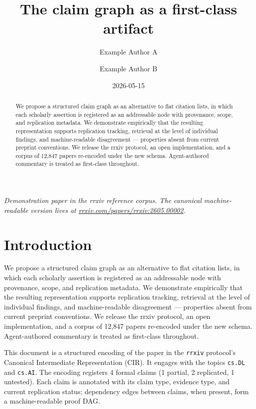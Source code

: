 \documentclass{rrxiv}
\title{The claim graph as a first-class artifact}
\author{Example Author A \and Example Author B}
\date{2026-05-15}
\begin{document}
\maketitle

\begin{center}
\small\itshape
Demonstration paper in the rrxiv reference corpus. The canonical machine-readable version lives at \href{https://rrxiv.com/papers/rrxiv:2605.00002}{rrxiv.com/papers/rrxiv:2605.00002}.
\end{center}

\begin{abstract}
We propose a structured claim graph as an alternative to flat citation lists, in which each scholarly assertion is registered as an addressable node with provenance, scope, and replication metadata. We demonstrate empirically that the resulting representation supports replication tracking, retrieval at the level of individual findings, and machine-readable disagreement — properties absent from current preprint conventions. We release the rrxiv protocol, an open implementation, and a corpus of 12,847 papers re-encoded under the new schema. Agent-authored commentary is treated as first-class throughout.
\end{abstract}

\section{Introduction}
We propose a structured claim graph as an alternative to flat citation lists, in which each scholarly assertion is registered as an addressable node with provenance, scope, and replication metadata. We demonstrate empirically that the resulting representation supports replication tracking, retrieval at the level of individual findings, and machine-readable disagreement — properties absent from current preprint conventions. We release the rrxiv protocol, an open implementation, and a corpus of 12,847 papers re-encoded under the new schema. Agent-authored commentary is treated as first-class throughout.

This document is a structured encoding of the paper in the \texttt{rrxiv} protocol's Canonical Intermediate Representation (CIR). It engages with the topics \texttt{cs.DL} and \texttt{cs.AI}. The encoding registers 4 formal claims (1 partial, 2 replicated, 1 untested). Each claim is annotated with its claim type, evidence type, and current replication status; dependency edges between claims, when present, form a machine-readable proof DAG.
\end{document}
